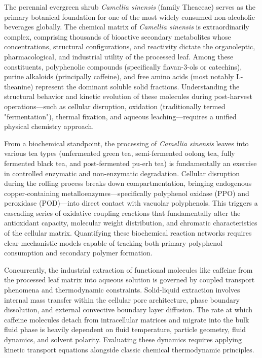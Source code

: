 \documentclass{article}
\begin{document}
The perennial evergreen shrub \textit{Camellia sinensis} (family Theaceae) serves as the primary botanical foundation for one of the most widely consumed non-alcoholic beverages globally. The chemical matrix of \textit{Camellia sinensis} is extraordinarily complex, comprising thousands of bioactive secondary metabolites whose concentrations, structural configurations, and reactivity dictate the organoleptic, pharmacological, and industrial utility of the processed leaf. Among these constituents, polyphenolic compounds (specifically flavan-3-ols or catechins), purine alkaloids (principally caffeine), and free amino acids (most notably L-theanine) represent the dominant soluble solid fractions. Understanding the structural behavior and kinetic evolution of these molecules during post-harvest operations—such as cellular disruption, oxidation (traditionally termed "fermentation"), thermal fixation, and aqueous leaching—requires a unified physical chemistry approach.

From a biochemical standpoint, the processing of \textit{Camellia sinensis} leaves into various tea types (unfermented green tea, semi-fermented oolong tea, fully fermented black tea, and post-fermented pu-erh tea) is fundamentally an exercise in controlled enzymatic and non-enzymatic degradation. Cellular disruption during the rolling process breaks down compartmentation, bringing endogenous copper-containing metalloenzymes—specifically polyphenol oxidase (PPO) and peroxidase (POD)—into direct contact with vacuolar polyphenols. This triggers a cascading series of oxidative coupling reactions that fundamentally alter the antioxidant capacity, molecular weight distribution, and chromatic characteristics of the cellular matrix. Quantifying these biochemical reaction networks requires clear mechanistic models capable of tracking both primary polyphenol consumption and secondary polymer formation.

Concurrently, the industrial extraction of functional molecules like caffeine from the processed leaf matrix into aqueous solution is governed by coupled transport phenomena and thermodynamic constraints. Solid-liquid extraction involves internal mass transfer within the cellular pore architecture, phase boundary dissolution, and external convective boundary layer diffusion. The rate at which caffeine molecules detach from intracellular matrices and migrate into the bulk fluid phase is heavily dependent on fluid temperature, particle geometry, fluid dynamics, and solvent polarity. Evaluating these dynamics requires applying kinetic transport equations alongside classic chemical thermodynamic principles.
\end{document}

